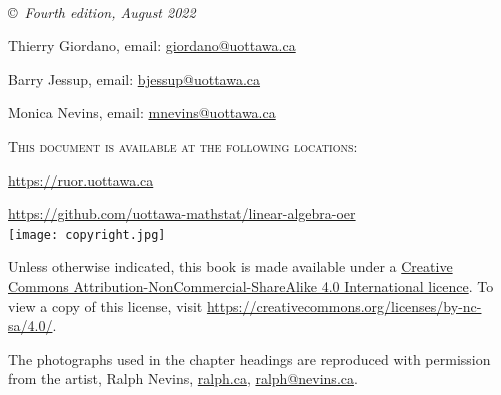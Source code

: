 \documentclass[11pt]{book} %
\begin{document}

\newpage
~\vfill
\thispagestyle{empty}





\noindent \copyright\ \textit{Fourth edition, August 2022} %



\smallskip
\noindent Thierry Giordano, email:
\href{mailto:giordano@uottawa.ca}{giordano@uottawa.ca}



\smallskip
\noindent Barry Jessup, email:
\href{mailto:bjessup@uottawa.ca}{bjessup@uottawa.ca}


\smallskip

\noindent Monica Nevins, email:
\href{mailto:mnevins@uottawa.ca}{mnevins@uottawa.ca}

\smallskip

\noindent \textsc{This document is available at the following locations:} 

\href{https://ruor.uottawa.ca/handle/10393/43430}{https://ruor.uottawa.ca} 

\href{https://github.com/uottawa-mathstat/linear-algebra-oer}{https://github.com/uottawa-mathstat/linear-algebra-oer}  \\%



\noindent \texttt{[image: copyright.jpg]}

\noindent Unless otherwise indicated, this book is made available under a \href{https://creativecommons.org/licenses/by-nc-sa/4.0/}{Creative Commons Attribution-NonCommercial-ShareAlike 4.0 International licence}.  To view a copy of this license, visit \url{https://creativecommons.org/licenses/by-nc-sa/4.0/}.

\noindent The photographs used in the chapter headings are reproduced with permission from the artist, Ralph Nevins, \url{ralph.ca}, \href{mailto:ralph@nevins.ca}{ralph@nevins.ca}.

\vspace{1in}

\end{document}
